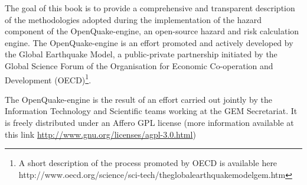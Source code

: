 The goal of this book is to provide a comprehensive and transparent description
of the methodologies adopted during the implementation of the hazard component
of the OpenQuake-engine, an open-source hazard and risk calculation engine.  
%
The OpenQuake-engine is an effort promoted and actively developed by the
Global Earthquake Model, a public-private partnership initiated by the Global
Science Forum of the Organisation for Economic Co-operation and Development 
(OECD)\footnote{A short description of the process promoted by OECD is available 
here http://www.oecd.org/science/sci-tech/theglobalearthquakemodelgem.htm}.

The OpenQuake-engine is the result of an effort carried out jointly by the
Information Technology and Scientific teams working at the GEM Secretariat. 
It is freely distributed under an Affero GPL license 
(more information available at this link 
\href{http://www.gnu.org/licenses/agpl-3.0.html}{http://www.gnu.org/licenses/agpl-3.0.html})
